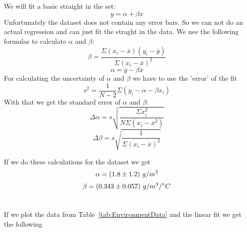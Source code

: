 \documentclass[11pt]{article}
\begin{document}
    \section{}
    We will fit a basic straight in the set:
    \begin{equation}
        y = \alpha + \beta x
    \end{equation}
    Unfortunately the dataset does not contain any error bars.
    So we can not do an actual regression and can just fit the straght in the data.
    We nee the following formulas to calculate $\alpha$ and $\beta$:
    \begin{equation}
        \beta = \frac{\Sigma (x_i - \overline{x}) (y_i - \overline{y})}{\Sigma (x_i - \overline{x})^2} 
    \end{equation}
    \begin{equation}
        \alpha = \overline{y} - \beta \overline{x}
    \end{equation}
    For calculating the uncertainty of $\alpha$ and $\beta$ we have to use the 'error' of the fit
    \begin{equation}
        s^2 = \frac{1}{N-2}\Sigma (y_i - \alpha - \beta x_i)
    \end{equation}
    With that we get the standard error of $\alpha$ and $\beta$:
    \begin{equation}
        \Delta\alpha = s \sqrt { \frac{\Sigma x_i^2}{N \Sigma (x_i - \overline{x}^2)}}
    \end{equation}
    \begin{equation}
        \Delta\beta = s \sqrt {\frac{1}{\Sigma (x_i - \overline{x})^2}}
    \end{equation}

    If we do these calculations for the dataset we get
    \begin{equation*}
        \alpha = (1.8 \pm 1.2)\ g / m^3
    \end{equation*}
    \begin{equation*}
        \beta = (0.343 \pm 0.057)\ g / m^3 / ^{\circ} C
    \end{equation*}

    \section{}
    If we plot the data from Table~\ref{tab:EnvironmentData} and the linear fit we get the following
    
\end{document}
